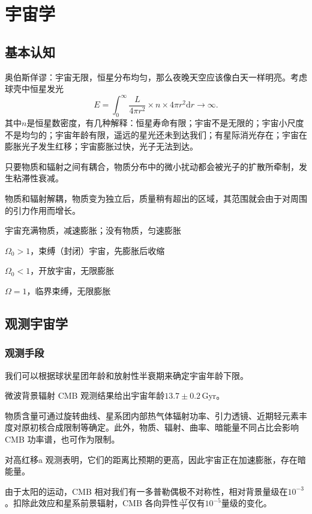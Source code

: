 \documentclass[../天体物理基础.tex]{subfiles}
\begin{document}
\section{宇宙学}
\subsection{基本认知}
奥伯斯佯谬：宇宙无限，恒星分布均匀，那么夜晚天空应该像白天一样明亮。考虑球壳中恒星发光
\begin{equation}
E=\int_{0}^{\infty}\frac{L}{4\pi r^{2}}\times n\times4\pi r^{2}\mathrm{d}r\to\infty.
\end{equation}
其中$n$是恒星数密度，有几种解释：恒星寿命有限；宇宙不是无限的；宇宙小尺度不是均匀的；宇宙年龄有限，遥远的星光还未到达我们；有星际消光存在；宇宙在膨胀光子发生红移；宇宙膨胀过快，光子无法到达。

只要物质和辐射之间有耦合，物质分布中的微小扰动都会被光子的扩散所牵制，发生粘滞性衰减。

物质和辐射解耦，物质变为独立后，质量稍有超出的区域，其范围就会由于对周围的引力作用而增长。


宇宙充满物质，减速膨胀；没有物质，匀速膨胀

$\Omega_{0}>1$，束缚（封闭）宇宙，先膨胀后收缩

$\Omega_{0}<1$，开放宇宙，无限膨胀

$\Omega=1$，临界束缚，无限膨胀

\subsection{观测宇宙学}
\subsubsection{观测手段}
我们可以根据球状星团年龄和放射性半衰期来确定宇宙年龄下限。

微波背景辐射 CMB 观测结果给出宇宙年龄$13.7\pm0.2\,\mathrm{Gyr}$。

物质含量可通过旋转曲线、星系团内部热气体辐射功率、引力透镜、近期轻元素丰度对原初核合成限制等确定。此外，物质、辐射、曲率、暗能量不同占比会影响 CMB 功率谱，也可作为限制。

对高红移\uppercase\expandafter{}a 观测表明，它们的距离比预期的更高，因此宇宙正在加速膨胀，存在暗能量。

由于太阳的运动，CMB 相对我们有一多普勒偶极不对称性，相对背景量级在$10^{-3}$。扣除此效应和星系前景辐射，CMB 各向异性$\frac{\Delta{}T}{T}$仅有$10^{-5}$量级的变化。
\end{document}
